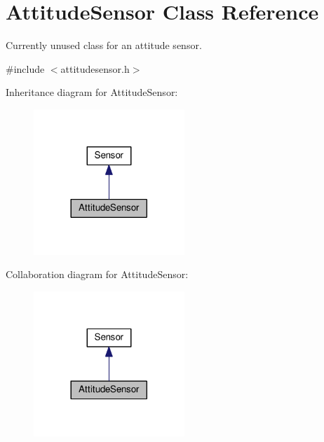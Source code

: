 \hypertarget{classAttitudeSensor}{}\section{Attitude\+Sensor Class Reference}
\label{classAttitudeSensor}


Currently unused class for an attitude sensor.  




{\ttfamily \#include $<$attitudesensor.\+h$>$}



Inheritance diagram for Attitude\+Sensor\+:\nopagebreak
\begin{figure}[H]
\begin{center}
\leavevmode
\includegraphics[width=161pt]{classAttitudeSensor__inherit__graph}
\end{center}
\end{figure}


Collaboration diagram for Attitude\+Sensor\+:\nopagebreak
\begin{figure}[H]
\begin{center}
\leavevmode
\includegraphics[width=161pt]{classAttitudeSensor__coll__graph}
\end{center}
\end{figure}
